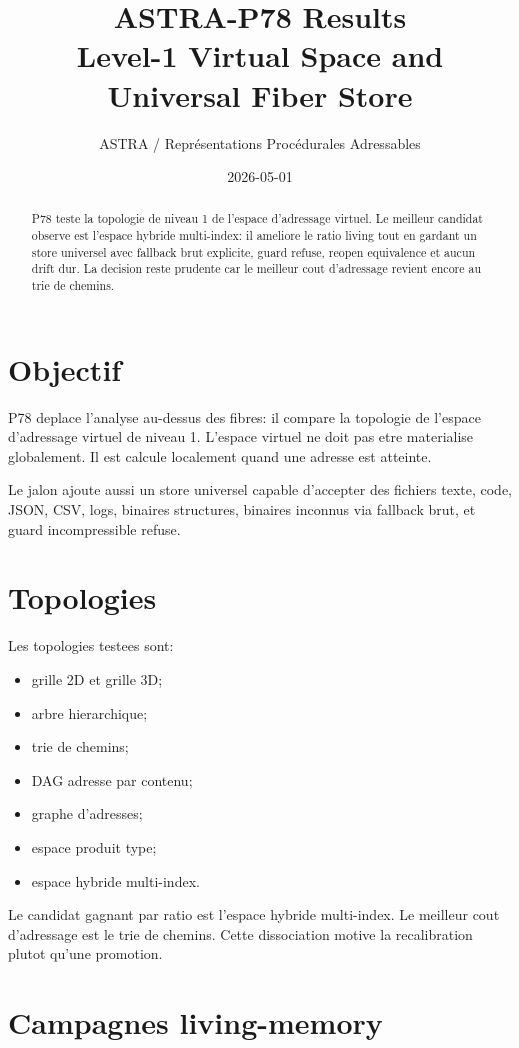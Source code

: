 \documentclass[a4paper,11pt]{article}
\title{\textbf{ASTRA-P78 Results}\\Level-1 Virtual Space and Universal Fiber Store}
\author{ASTRA / Repr\'esentations Proc\'edurales Adressables}
\date{2026-05-01}
\begin{document}
\maketitle

\begin{abstract}
P78 teste la topologie de niveau 1 de l'espace d'adressage virtuel. Le meilleur
candidat observe est l'espace hybride multi-index: il ameliore le ratio living
tout en gardant un store universel avec fallback brut explicite, guard refuse,
reopen equivalence et aucun drift dur. La decision reste prudente car le meilleur
cout d'adressage revient encore au trie de chemins.
\end{abstract}

\section{Objectif}

P78 deplace l'analyse au-dessus des fibres: il compare la topologie de l'espace
d'adressage virtuel de niveau 1. L'espace virtuel ne doit pas etre materialise
globalement. Il est calcule localement quand une adresse est atteinte.

Le jalon ajoute aussi un store universel capable d'accepter des fichiers texte,
code, JSON, CSV, logs, binaires structures, binaires inconnus via fallback brut,
et guard incompressible refuse.

\section{Topologies}

Les topologies testees sont:
\begin{itemize}
  \item grille 2D et grille 3D;
  \item arbre hierarchique;
  \item trie de chemins;
  \item DAG adresse par contenu;
  \item graphe d'adresses;
  \item espace produit type;
  \item espace hybride multi-index.
\end{itemize}

Le candidat gagnant par ratio est l'espace hybride multi-index. Le meilleur cout
d'adressage est le trie de chemins. Cette dissociation motive la recalibration
plutot qu'une promotion.

\section{Campagnes living-memory}
\end{document}
